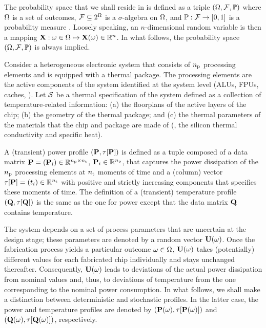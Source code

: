 
The probability space that we shall reside in is defined as a triple $(\Omega, \mathcal{F}, \mathbb{P})$ where $\Omega$ is a set of outcomes, $\mathcal{F} \subseteq 2^\Omega$ is a $\sigma$-algebra on $\Omega$, and $\mathbb{P}: \mathcal{F} \to [0, 1]$ is a probability measure \cite{maitre2010}.
Loosely speaking, an $n$-dimensional random variable is then a mapping $\mathbf{X}: \omega \in \Omega \mapsto \mathbf{X}(\omega) \in \mathbb{R}^n$.
In what follows, the probability space $(\Omega, \mathcal{F}, \mathbb{P})$ is always implied.

Consider a heterogeneous electronic system that consists of ${n_\text{p}}$ processing elements and is equipped with a thermal package.
The processing elements are the active components of the system identified at the system level (ALUs, FPUs, caches, \etc).
Let $\mathcal{S}$ be a thermal specification of the system defined as a collection of temperature-related information: (a) the floorplans of the active layers of the chip; (b) the geometry of the thermal package; and (c) the thermal parameters of the materials that the chip and package are made of (\eg, the silicon thermal conductivity and specific heat).

A (transient) power profile $\profileP$ is defined as a tuple composed of a data matrix $\mP = (\vP_i) \in \real^{\nprocs \times \nsteps}$, $\mathbf{P}_i \in \mathbb{R}^{n_\text{p}}$, that captures the power dissipation of the ${n_\text{p}}$ processing elements at ${n_\text{t}}$ moments of time and a (column) vector $\partition{\mP} = (\t_i) \in \real^{\nsteps}$ with positive and strictly increasing components that specifies these moments of time.
The definition of a (transient) temperature profile $\profileT$ is the same as the one for power except that the data matrix $\mTO$ contains temperature.

The system depends on a set of process parameters that are uncertain at the design stage; these parameters are denoted by a random vector $\mathbf{U}(\omega)$.
Once the fabrication process yields a particular outcome $\omega \in \Omega$, $\mathbf{U}(\omega)$ takes (potentially) different values for each fabricated chip individually and stays unchanged thereafter.
Consequently, $\mathbf{U}(\omega)$ leads to deviations of the actual power dissipation from nominal values and, thus, to deviations of temperature from the one corresponding to the nominal power consumption.
In what follows, we shall make a distinction between deterministic and stochastic profiles.
In the latter case, the power and temperature profiles are denoted by $\profileP{\o}$ and $\profileT{\o}$, respectively.

